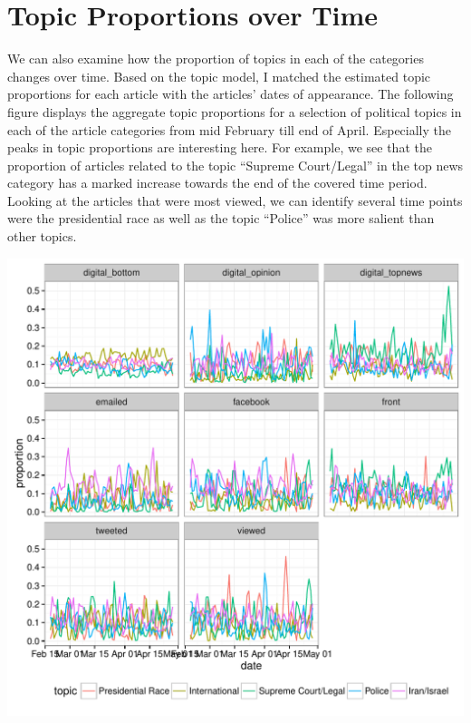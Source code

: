 \documentclass[12pt]{article}\usepackage[]{graphicx}\usepackage[]{color}
\makeatletter
\def\maxwidth{ %
  \ifdim\Gin@nat@width>\linewidth
    \linewidth
  \else
    \Gin@nat@width
  \fi
}
\newenvironment{knitrout}{}{} %
\makeatother
\begin{document}
\section{Topic Proportions over Time}

We can also examine how the proportion of topics in each of the categories changes over time. Based on the topic model, I matched the estimated topic proportions for each article with the articles' dates of appearance. The following figure displays the aggregate topic proportions for a selection of political topics in each of the article categories from mid February till end of April. Especially the peaks in topic proportions are interesting here. For example, we see that the proportion of articles related to the topic ``Supreme Court/Legal'' in the top news category has a marked increase towards the end of the covered time period. Looking at the articles that were most viewed, we can identify several time points were the presidential race as well as the topic ``Police'' was more salient than other topics.


\begin{knitrout}
\color{fgcolor}
\includegraphics[width=\maxwidth]{figure/unnamed-chunk-9-1} 

\end{knitrout}
\end{document}
